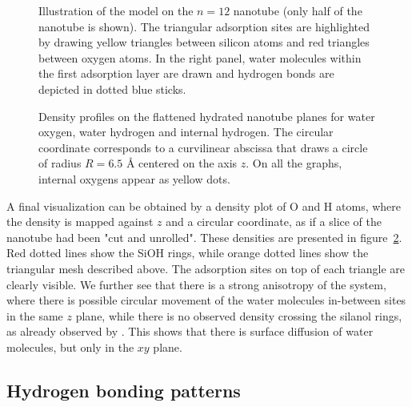 \documentclass[thesis]{subfiles}
\begin{document}
\begin{figure}[t]
	\centering
	\caption{Illustration of the model on the $n=12$ nanotube (only half of the nanotube is shown). The triangular adsorption sites are highlighted by drawing yellow triangles between silicon atoms and red triangles between oxygen atoms. In the right panel, water molecules within the first adsorption layer are drawn and hydrogen bonds are depicted in dotted blue sticks.}
    \label{fig:imogolite:hbonds:sites}
\end{figure}

\begin{figure}[t]
  \centering
  \caption{Density profiles on the flattened hydrated nanotube planes for water oxygen, water hydrogen and internal hydrogen. The circular coordinate corresponds to a curvilinear abscissa that draws a circle of radius $R = 6.5$ {\AA} centered on the axis $z$. On all the graphs, internal oxygens appear as yellow dots.}
  \label{fig:imogolite:density:circular}
\end{figure}

A final visualization can be obtained by a density plot of O and H atoms, where
the density is mapped against $z$ and a circular coordinate, as if a slice of
the nanotube had been "cut and unrolled". These densities are presented in
figure~\ref{fig:imogolite:density:circular}. Red dotted lines show the SiOH rings, while orange
dotted lines show the triangular mesh described above. The adsorption sites on
top of each triangle are clearly visible. We further see that there is a strong
anisotropy of the system, where there is possible circular movement of the water
molecules in-between sites in the same $z$ plane, while there is no observed
density crossing the silanol rings, as already observed by
\citeauthor{Creton2008}\cite{Creton2008}. This shows that there is surface
diffusion of water molecules, but only in the $xy$ plane.

\subsection{Hydrogen bonding patterns}
\end{document}
